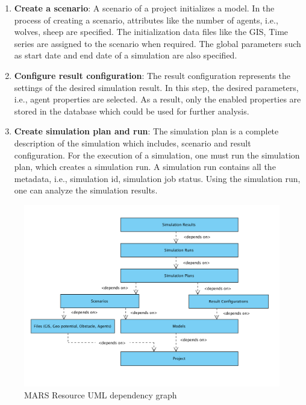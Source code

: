\begin{enumerate}
            \item 
                \textbf{Create a scenario}: A scenario of a project initializes a model.
                In the process of creating a scenario, attributes like the number of agents, i.e., wolves, sheep are specified. 
                The initialization data files like the GIS, Time series are assigned to the scenario when required. 
                The global parameters such as start date and end date of a simulation are also specified.

            \item 
                \textbf{Configure result configuration}: The result configuration represents the settings of the desired simulation result. In this step, the desired parameters,
                i.e., agent properties are selected. As a result, only the enabled properties are stored in the database which could be used for further analysis.

            \item  
                \textbf{Create simulation plan and run}: The simulation plan is a complete description of the
                 simulation which includes, scenario and result configuration. For the execution of a simulation,
                 one must run the simulation plan, which creates
                 a simulation run. A simulation run contains all the metadata, i.e., simulation id, simulation 
                 job status. Using the simulation run, one can analyze the 
                 simulation results.
        \end{enumerate} 
        
        \begin{figure}[H]
            \centering \includegraphics[scale=0.6]{grafiken/marsDependency.png}
            \caption{MARS Resource UML dependency graph}
            \label{fig:marsDependency}
        \end{figure}
        
